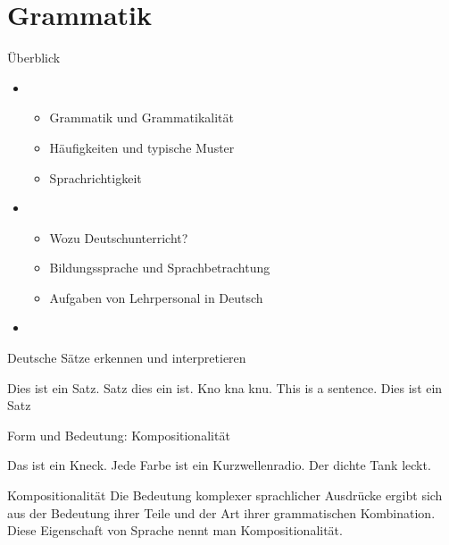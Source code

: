 \section{Grammatik}


\begin{frame}
  {Überblick}
  \onslide<+->
  \begin{itemize}[<+->]
    \item {}
      \begin{itemize}
        \item Grammatik und Grammatikalität
        \item Häufigkeiten und typische Muster
        \item Sprachrichtigkeit
      \end{itemize}
      \Zeile
    \item {}
      \begin{itemize}
        \item Wozu Deutschunterricht?
        \item Bildungssprache und Sprachbetrachtung
        \item Aufgaben von Lehrpersonal in Deutsch
      \end{itemize}
      \Zeile
    \item \citet[Kapitel 1 und 3]{Schaefer2018b}
  \end{itemize}
\end{frame}

\begin{frame}
  {Deutsche Sätze erkennen und interpretieren}
  \onslide<+->
  \onslide<+->
  \begin{exe}
    \ex Dies ist ein Satz.
  \onslide<+->
    \ex Satz dies ein ist.
  \onslide<+->
    \ex Kno kna knu.
  \onslide<+->
    \ex This is a sentence.
  \onslide<+->
    \Zeile
    \ex Dies ist ein Satz
  \end{exe}
\end{frame}


\begin{frame}
  {Form und Bedeutung: Kompositionalität}
  \onslide<+->
  \onslide<+->
  \begin{exe}
    \ex Das ist ein Kneck.
    \onslide<+->
    \Zeile
  \ex Jede Farbe ist ein Kurzwellenradio.
  \ex Der dichte Tank leckt.
\end{exe}
    \Zeile
  \onslide<+->

  \Large\begin{block}{Kompositionalität}
    Die Bedeutung komplexer sprachlicher Ausdrücke ergibt sich aus der Bedeutung ihrer Teile und der Art ihrer grammatischen Kombination. 
    Diese Eigenschaft von Sprache nennt man Kompositionalität.
  \end{block}
\end{frame}

